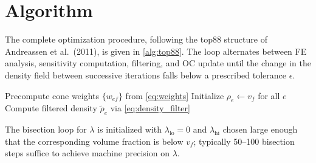 \documentclass[11pt,a4paper]{article}
\begin{document}
\section{Algorithm}
\label{sec:algorithm}

The complete optimization procedure, following the top88 structure of
Andreassen et al.\ (2011), is given in \cref{alg:top88}.  The loop
alternates between FE analysis, sensitivity computation, filtering, and OC
update until the change in the density field between successive iterations
falls below a prescribed tolerance $\epsilon$.

\begin{algorithm}[ht]
\DontPrintSemicolon
\caption{top88 topology optimization (Andreassen 2011)}
\label{alg:top88}
\BlankLine
Precompute cone weights $\{w_{ef}\}$ from \cref{eq:weights}\;
Initialize $\rho_e \leftarrow v_f$ for all $e$\;
Compute filtered density $\tilde{\rho}_e$ via \cref{eq:density_filter}\;
\BlankLine
{}
\Return{$\tilde{\boldsymbol{\rho}}$}
\end{algorithm}

The bisection loop for $\lambda$ is initialized with $\lambda_\mathrm{lo} = 0$
and $\lambda_\mathrm{hi}$ chosen large enough that the corresponding volume
fraction is below $v_f$; typically 50--100 bisection steps suffice to
achieve machine precision on $\lambda$.

\end{document}
